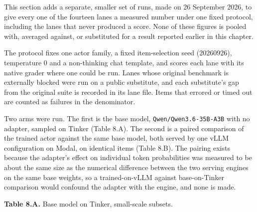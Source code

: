 \documentclass[12pt,a4paper]{report}
\begin{document}
This section adds a separate, smaller set of runs, made on 26 September
2026, to give every one of the fourteen lanes a measured number under
one fixed protocol, including the lanes that never produced a score.
None of these figures is pooled with, averaged against, or substituted
for a result reported earlier in this chapter.

The protocol fixes one actor family, a fixed item-selection seed
(20260926), temperature 0 and a non-thinking chat template, and scores
each lane with its native grader where one could be run. Lanes whose
original benchmark is externally blocked were run on a public
substitute, and each substitute's gap from the original suite is
recorded in its lane file. Items that errored or timed out are counted
as failures in the denominator.

Two arms were run. The first is the base model,
\texttt{Qwen/Qwen3.6-35B-A3B} with no adapter, sampled on Tinker (Table
8.A). The second is a paired comparison of the trained actor against the
same base model, both served by one vLLM configuration on Modal, on
identical items (Table 8.B). The pairing exists because the adapter's
effect on individual token probabilities was measured to be about the
same size as the numerical difference between the two serving engines on
the same base weights, so a trained-on-vLLM against base-on-Tinker
comparison would confound the adapter with the engine, and none is made.

\textbf{Table
8.A.} Base model on Tinker, small-scale subsets.
\end{document}
